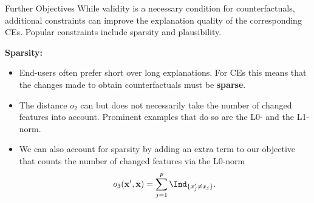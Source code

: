\documentclass[11pt,compress,t,notes=noshow, xcolor=table]{beamer}
\begin{document}
\begin{vbframe}{Further Objectives}
	While validity is a necessary condition for counterfactuals, additional constraints can improve the explanation quality of the corresponding CEs. Popular constraints include sparsity and plausibility.
	
	\textbf{Sparsity:}
	\begin{itemize}
		\item End-users often prefer short over long explanations. For CEs this means that the changes made to obtain counterfactuals must be \textbf{sparse}. 
		\item The distance $o_2$ can but does not necessarily take the number of changed features into account. Prominent examples that do so are the L0- and the L1-norm.
        \item We can also account for sparsity by adding an extra term to our objective that counts the number of changed features via the L0-norm $$o_3(\xv', \xv) = \sum_{j = 1}^p \Ind_{\{ x'_j \neq x_j \}}.$$ 
	\end{itemize}
	\framebreak
	

\end{vbframe}
\end{document}
